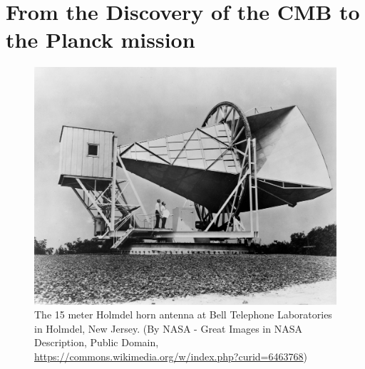 \documentclass{article}
\begin{document}

\section{From the Discovery of the CMB to the Planck mission}

\begin{figure}
\includegraphics[width=\textwidth]{Horn_Antenna.jpeg}
\caption{The 15 meter Holmdel horn antenna at Bell Telephone Laboratories in Holmdel, New Jersey.
(By NASA - Great Images in NASA Description, Public Domain, \url{https://commons.wikimedia.org/w/index.php?curid=6463768})}
\end{figure}
\end{document}
